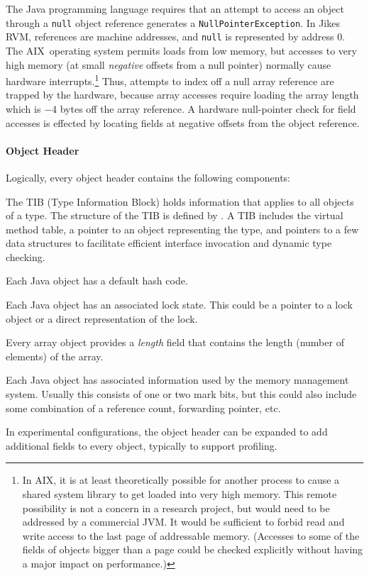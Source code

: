 The Java programming language requires that an attempt to access an
object through a {\tt null} 
object reference generates a {\tt NullPointerException}.  In Jikes RVM, references
are machine addresses, and {\tt null} is represented by address $0$.
The AIX\TMweb\ operating system permits loads from low memory,
but accesses 
to very high memory (at small {\em negative} offsets from a null
pointer) normally cause hardware interrupts.\footnote{In AIX, it is at
least theoretically possible for another process to cause a shared
system library to get loaded into very high memory.  This remote
possibility is not a concern in a research project, but would need to
be addressed by a commercial JVM.  It would be sufficient to forbid
read and write access to the last page of addressable memory.
(Accesses to some of the fields of objects bigger than a page could be
checked explicitly without having a major impact on performance.)}
Thus, attempts to index off a null array reference are trapped by
the hardware, because array accesses require loading the array length
which is $-4$ bytes off the array reference.  A hardware null-pointer
check for field accesses is effected by locating fields at negative
offsets from the object reference.

\paragraph{Object Header}
Logically, every object header contains the following components:
\begin{description}
%
\item[TIB Pointer] The TIB (Type Information Block) holds information that
applies to all objects of a type.  The structure of the TIB is defined by 
.
A TIB includes the virtual method table, a pointer to an object
representing the type, and pointers to a few data structures to
facilitate efficient interface invocation and dynamic type checking.
%
\item[Default Hash Code] Each Java object has a default hash code.
%
\item[Lock] Each Java object has an associated lock state.  This could be a
pointer to a lock object or a direct representation of the lock.
%
\item[Array Length] Every array object provides a {\em length} field
that contains the length (number of elements) of the array.
%
\item[Garbage Collection Information] Each Java object has associated
information used by the memory management system.  Usually this consists of one
or two mark bits, but this could also include some combination of a reference
count, forwarding pointer, etc.
%
\item[Misc Fields] In experimental configurations, the object header
can be expanded to add additional fields to every object, typically to
support profiling. 
\end{description}

